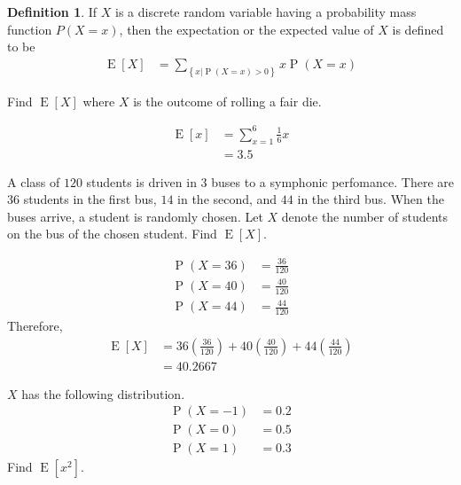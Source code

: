 \documentclass[titlepage, fleqn, a4paper, 12pt, twoside]{article}
\theoremstyle{definition}
\newtheorem{definition}{Definition}
\theoremstyle{theorem}
\DeclareMathOperator{\prob}{\mathrm{P}}
\DeclareMathOperator{\expct}{\mathrm{E}}
\begin{document}
\begin{definition}
	If $X$ is a discrete random variable having a probability mass function $P(X = x)$, then the expectation or the expected value of $X$ is defined to be
	\begin{align*}
		\expct[X] & = \sum\limits_{\left\{ x | \prob(X = x) > 0 \right\}} x \prob(X = x)
	\end{align*}
\end{definition}

\begin{question}
	Find $\expct[X]$ where $X$ is the outcome of rolling a fair die.
\end{question}

\begin{solution}
	\begin{align*}
		\expct[x] & = \sum\limits_{x = 1}^{6} \frac{1}{6} x \\
                          & = 3.5
	\end{align*}
\end{solution}

\begin{question}
	A class of $120$ students is driven in $3$ buses to a symphonic perfomance.
	There are $36$ students in the first bus, $14$ in the second, and $44$ in the third bus.
	When the buses arrive, a student is randomly chosen.
	Let $X$ denote the number of students on the bus of the chosen student.
	Find $\expct[X]$.
\end{question}

\begin{solution}
	\begin{align*}
		\prob(X = 36) & = \frac{36}{120} \\
		\prob(X = 40) & = \frac{40}{120} \\
		\prob(X = 44) & = \frac{44}{120}
	\end{align*}
	Therefore,
	\begin{align*}
		\expct[X] & = 36 \left( \frac{36}{120} \right) + 40 \left( \frac{40}{120} \right) + 44 \left( \frac{44}{120} \right) \\
                          & = 40.2667
	\end{align*}
\end{solution}

\begin{question}
	$X$ has the following distribution.
	\begin{align*}
		\prob(X = -1) & = 0.2 \\
		\prob(X = 0)  & = 0.5 \\
		\prob(X = 1)  & = 0.3
	\end{align*}
	Find $\expct\left[ x^2 \right]$.
\end{question}
\end{document}
